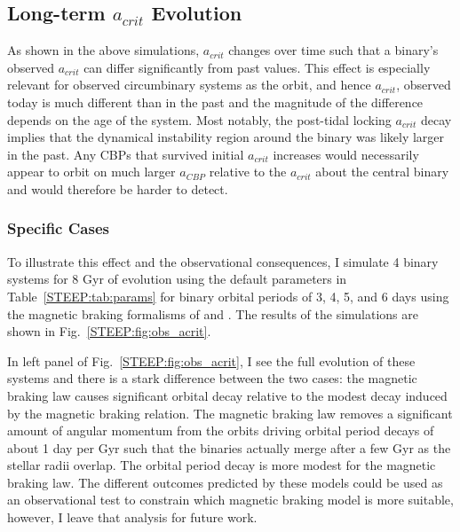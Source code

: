 \subsection{Long-term $a_{crit}$ Evolution} \label{STEEP:sec:obs_acrit}

As shown in the above simulations, $a_{crit}$ changes over time such that a binary's observed $a_{crit}$ can differ significantly from past values.  This effect is especially relevant for observed \kepler circumbinary systems as the orbit, and hence $a_{crit}$, observed today is much different than in the past and the magnitude of the difference depends on the age of the system.  Most notably, the post-tidal locking $a_{crit}$ decay implies that the dynamical instability region around the binary was likely larger in the past.  Any CBPs that survived initial $a_{crit}$ increases would necessarily appear to orbit on much larger $a_{CBP}$ relative to the $a_{crit}$ about the central binary and would therefore be harder to detect.

\subsubsection{Specific Cases}

To illustrate this effect and the observational consequences, I simulate 4 binary systems for 8 Gyr of evolution using the default parameters in Table~\ref{STEEP:tab:params} for binary orbital periods of 3, 4, 5, and 6 days using the magnetic braking formalisms of \citet{Reiners2012} and \citet{Repetto2014}.  The results of the simulations are shown in Fig.~\ref{STEEP:fig:obs_acrit}.

In left panel of Fig.~\ref{STEEP:fig:obs_acrit}, I see the full evolution of these systems and there is a stark difference between the two cases: the \citet{Reiners2012} magnetic braking law causes significant orbital decay relative to the modest decay induced by the \citet{Repetto2014} magnetic braking relation.  The \citet{Reiners2012} magnetic braking law removes a significant amount of angular momentum from the orbits driving orbital period decays of about 1 day per Gyr such that the binaries actually merge after a few Gyr as the stellar radii overlap.  The orbital period decay is more modest for the \citet{Repetto2014} magnetic braking law.  The different outcomes predicted by these models could be used as an observational test to constrain which magnetic braking model is more suitable, however, I leave that analysis for future work.

